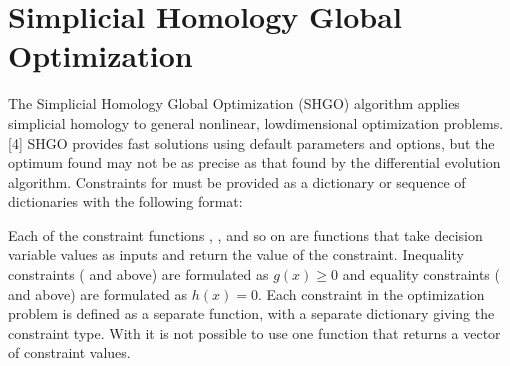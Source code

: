 \documentclass[letterpaper,10pt,english]{sphinxmanual}
\begin{document}
\section{Simplicial Homology Global Optimization}
\label{\detokenize{optimizers:simplicial-homology-global-optimization}}
\sphinxAtStartPar
The Simplicial Homology Global Optimization (SHGO) algorithm applies simplicial homology to general non\sphinxhyphen{}linear, low\sphinxhyphen{}dimensional optimization problems. {[}4{]} SHGO provides fast solutions using default parameters and options, but the optimum found may not be as precise as that found by the differential evolution algorithm. Constraints for  must be provided as a dictionary or sequence of dictionaries with the following format:

\begin{sphinxVerbatim}[commandchars=\\\{\}]
  \PYG{p}{[}    
                   
                   
                   
                 \PYG{p}{]}
\end{sphinxVerbatim}

\sphinxAtStartPar
Each of the constraint functions , , and so on are functions that take decision variable values as inputs and return the value of the constraint. Inequality constraints ( and  above) are formulated as \(g(x) \geq 0\) and equality constraints ( and  above) are formulated as \(h(x) = 0\). Each constraint in the optimization problem is defined as a separate function, with a separate dictionary giving the constraint type. With  it is not possible to use one function that returns a vector of constraint values.
\end{document}
